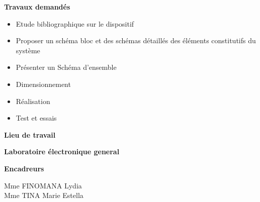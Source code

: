 \documentclass[a4paper,12pt]{report}
\begin{document}
\begin{center}
\hspace{-13cm}
\textbf{Travaux demandés} \\[5mm]

\begin{itemize}
  \item[\ding{118}] Etude bibliographique sur le dispositif \\ [5mm]
   \item[\ding{118}]Proposer un schéma bloc et des schémas détaillés des éléments constitutifs du
système \\[5mm]
    \item[\ding{118}]Présenter un Schéma d’ensemble \\[5mm]
    \item[\ding{118}]Dimensionnement\\[5mm]
     \item[\ding{118}] Réalisation\\[5mm]
     \item[\ding{118}] Test et essais \\[5mm]
\end{itemize}


\renewcommand*{\FrenchLabelItem}{$\bullet$} %

\hspace{-14cm}
\textbf{Lieu de travail}\\[5mm]
\begin{flushleft}
  \textbf{Laboratoire électronique general} \\ [5mm]
	
	 
\end{flushleft}

\hspace{-14.8cm}
\textbf{Encadreurs}\\[5mm]
\begin{flushleft}
	Mme FINOMANA Lydia \\[5mm]
	Mme TINA Marie Estella
\end{flushleft}



\end{center}
\setcounter{page}{2}
\end{document}
